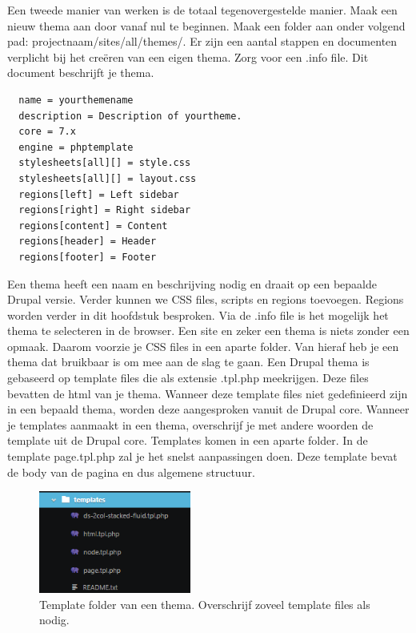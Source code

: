 \noindent
Een tweede manier van werken is de totaal tegenovergestelde manier. Maak een nieuw thema aan door vanaf nul te beginnen. Maak een folder aan onder volgend pad: projectnaam/sites/all/themes/. Er zijn een aantal stappen en documenten verplicht bij het creëren van een eigen thema. Zorg voor een .info file. Dit document beschrijft je thema. 

\begin{verbatim}
  name = yourthemename
  description = Description of yourtheme.
  core = 7.x
  engine = phptemplate
  stylesheets[all][] = style.css
  stylesheets[all][] = layout.css
  regions[left] = Left sidebar
  regions[right] = Right sidebar
  regions[content] = Content
  regions[header] = Header
  regions[footer] = Footer
\end{verbatim}

\noindent
Een thema heeft een naam en beschrijving nodig en draait op een bepaalde Drupal versie. Verder kunnen we CSS files, scripts en regions toevoegen. Regions worden verder in dit hoofdstuk besproken. Via de .info file is het mogelijk het thema te selecteren in de browser. Een site en zeker een thema is niets zonder een opmaak. Daarom voorzie je CSS files in een aparte folder. 
\newline\newline
Van hieraf heb je een thema dat bruikbaar is om mee aan de slag te gaan. Een Drupal thema is gebaseerd op template files die als extensie .tpl.php meekrijgen. Deze files bevatten de html van je thema. Wanneer deze template files niet gedefinieerd zijn in een bepaald thema, worden deze aangesproken vanuit de Drupal core. Wanneer je templates aanmaakt in een thema, overschrijf je met andere woorden de template uit de Drupal core. Templates komen in een aparte folder. In de template page.tpl.php zal je het snelst aanpassingen doen. Deze template bevat de body van de pagina en dus algemene structuur. 

\begin{figure}[!ht]
  \includegraphics[width=50mm]{img/dr-theme-template.png}
  \centering
  \caption{Template folder van een thema. Overschrijf zoveel template files als nodig.}
  \label{fig:Drupal thema templates.}
\end{figure}


